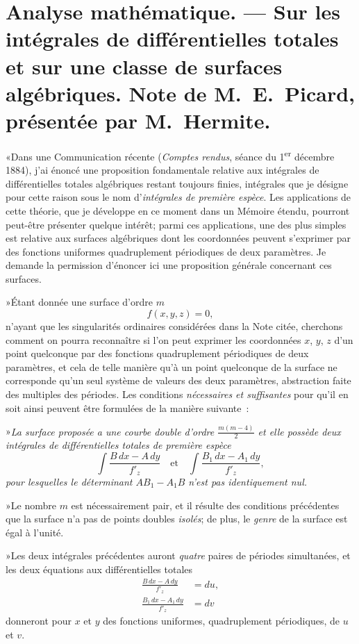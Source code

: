 \documentclass{article}
\begin{document}
\section*{Analyse mathématique. --- Sur les intégrales de différentielles totales et sur une classe de surfaces algébriques. Note de M.~E.~Picard, présentée par M.~Hermite.}

«Dans une Communication récente (\emph{Comptes rendus}, séance du 1\textsuperscript{er} décembre 1884), j'ai énoncé une proposition fondamentale relative aux intégrales de différentielles totales algébriques restant toujours finies, intégrales que je désigne pour cette raison sous le nom d'\emph{intégrales de première espèce}. Les applications de cette théorie, que je développe en ce moment dans un Mémoire étendu, pourront peut-être présenter quelque
intérêt; parmi ces applications, une des plus simples est relative aux surfaces algébriques dont les coordonnées peuvent s'exprimer par des fonctions uniformes quadruplement périodiques de deux paramètres. Je demande la permission d'énoncer ici une proposition générale concernant ces surfaces.

»Étant donnée une surface d'ordre $m$
\[
f(x, y, z) = 0,
\]
n'ayant que les singularités ordinaires considérées dans la Note citée, cherchons comment on pourra reconnaître si l'on peut exprimer les coordonnées $x$, $y$, $z$ d'un point quelconque par des fonctions quadruplement périodiques de deux paramètres, et cela de telle manière qu'à un point quelconque de la surface ne corresponde qu'un seul système de valeurs des deux paramètres, abstraction faite des multiples des périodes. Les conditions \emph{nécessaires et suffisantes} pour qu'il en soit ainsi peuvent être formulées de la manière suivante~:

»\emph{La surface proposée a une courbe double d'ordre $\frac{m(m - 4)}{2}$ et elle possède deux intégrales de différentielles totales de première espèce}
\[
\int \frac{B\,dx - A\,dy}{f'_{z}} \quad\text{et}\quad \int \frac{B_{1}\,dx - A_{1}\,dy}{f'_{z}},
\]
\emph{pour lesquelles le déterminant $AB_{1} - A_{1}B$ n'est pas identiquement nul.}

»Le nombre $m$ est nécessairement pair, et il résulte des conditions précédentes que la surface n'a pas de points doubles \emph{isolés}; de plus, le \emph{genre} de la surface est égal à l'unité.

»Les deux intégrales précédentes auront \emph{quatre} paires de périodes simultanées, et les deux équations aux différentielles totales
\[
\begin{aligned}
\frac{B\,dx - A\,dy}{f'_{z}} &= du, \\
\frac{B_{1}\,dx - A_{1}\,dy}{f'_{z}} &= dv
\end{aligned}
\]
donneront pour $x$ et $y$ des fonctions uniformes, quadruplement périodiques, de $u$ et $v$.
\end{document}
